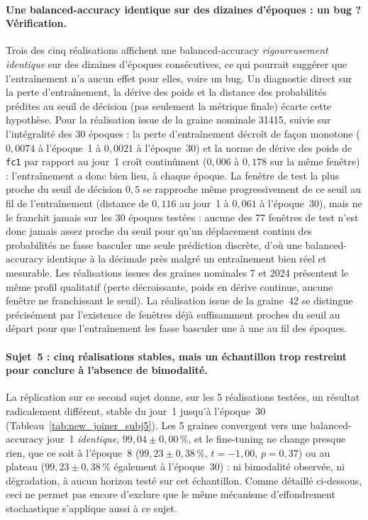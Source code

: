 \documentclass{acmart}
\begin{document}
\paragraph{Une balanced-accuracy identique sur des dizaines d'époques :
un bug ? Vérification.} Trois des cinq réalisations affichent une
balanced-accuracy \emph{rigoureusement identique} sur des dizaines d'époques
consécutives, ce qui pourrait suggérer que l'entraînement n'a aucun effet
pour elles, voire un bug. Un diagnostic direct sur la perte d'entraînement,
la dérive des poids et la distance des probabilités prédites au seuil de
décision (pas seulement la métrique finale) écarte cette hypothèse. Pour la
réalisation issue de la graine nominale 31415, suivie sur l'intégralité des
30 époques : la perte d'entraînement décroît de façon monotone
($0{,}0074$ à l'époque~1 à $0{,}0021$ à l'époque~30) et la norme de dérive
des poids de \texttt{fc1} par rapport au jour~1 croît continûment
($0{,}006$ à $0{,}178$ sur la même fenêtre) : l'entraînement a donc bien
lieu, à chaque époque. La fenêtre de test la plus proche du seuil de
décision $0{,}5$ se rapproche même progressivement de ce seuil au fil de
l'entraînement (distance de $0{,}116$ au jour~1 à $0{,}061$ à l'époque~30),
mais ne le franchit jamais sur les 30 époques testées : aucune des 77
fenêtres de test n'est donc jamais assez proche du seuil pour qu'un
déplacement continu des probabilités ne fasse basculer une seule prédiction
discrète, d'où une balanced-accuracy identique à la décimale près malgré un
entraînement bien réel et mesurable. Les réalisations issues des graines
nominales 7 et 2024 présentent le même profil qualitatif (perte
décroissante, poids en dérive continue, aucune fenêtre ne franchissant le
seuil). La réalisation issue de la graine~42 se distingue précisément par
l'existence de fenêtres déjà suffisamment proches du seuil au départ pour
que l'entraînement les fasse basculer une à une au fil des époques.

\paragraph{Sujet~5 : cinq réalisations stables, mais un échantillon trop
restreint pour conclure à l'absence de bimodalité.} La réplication sur ce
second sujet donne, sur les 5 réalisations testées, un résultat
radicalement différent, stable du jour~1 jusqu'à l'époque~30
(Tableau~\ref{tab:new_joiner_subj5}). Les 5 graines convergent vers une
balanced-accuracy jour~1 \emph{identique}, $99{,}04 \pm 0{,}00\,\%$, et le
fine-tuning ne change presque rien, que ce soit à l'époque~8 ($99{,}23 \pm
0{,}38\,\%$, $t=-1{,}00$, $p=0{,}37$) ou au plateau ($99{,}23 \pm
0{,}38\,\%$ également à l'époque~30) : ni bimodalité observée, ni
dégradation, à aucun horizon testé sur cet échantillon. Comme détaillé
ci-dessous, ceci ne permet pas encore d'exclure que le même mécanisme
d'effondrement stochastique s'applique aussi à ce sujet.
\end{document}
